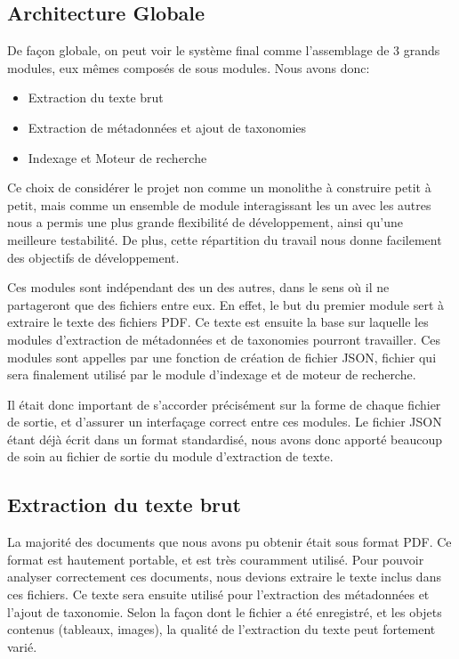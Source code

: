 

\subsection{Architecture Globale}
De façon globale, on peut voir le système final comme l'assemblage de 3 grands modules, eux mêmes composés de sous modules. 
Nous avons donc:
\begin{itemize}
	\item Extraction du texte brut
	\item Extraction de métadonnées et ajout de taxonomies
	\item Indexage et Moteur de recherche
\end{itemize}

Ce choix de considérer le projet non comme un monolithe à construire petit à petit, mais comme un ensemble de module interagissant les un avec les autres nous a permis une plus grande flexibilité de développement, ainsi qu'une meilleure testabilité. De plus, cette répartition du travail nous donne facilement des objectifs de développement. 

Ces modules sont indépendant des un des autres, dans le sens où il ne partageront que des fichiers entre eux. En effet, le but du premier module sert à extraire le texte des fichiers PDF. Ce texte est ensuite la base sur laquelle les modules d'extraction de métadonnées et de taxonomies pourront travailler. Ces modules sont appelles par une fonction de création de fichier JSON, fichier qui sera finalement utilisé par le module d'indexage et de moteur de recherche. 

Il était donc important de s'accorder précisément sur la forme de chaque fichier de sortie, et d'assurer un interfaçage correct entre ces modules. Le fichier JSON étant déjà écrit dans un format standardisé, nous avons donc apporté beaucoup de soin au fichier de sortie du module d'extraction de texte. 

\subsection{Extraction du texte brut}
La majorité des documents que nous avons pu obtenir était sous format PDF. Ce format est hautement portable, et est très couramment utilisé.
Pour pouvoir analyser correctement ces documents, nous devions extraire le texte inclus dans ces fichiers.
Ce texte sera ensuite utilisé pour l'extraction des métadonnées et l'ajout de taxonomie. Selon la façon dont le fichier a été enregistré, et les objets contenus (tableaux, images), la qualité de l'extraction du texte peut fortement varié. 

